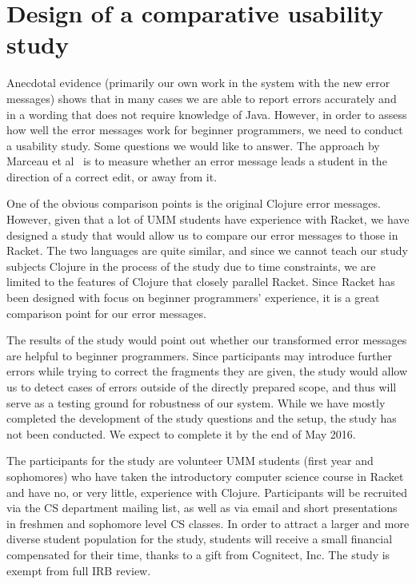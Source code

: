 \documentclass[submission,copyright,creativecommons]{eptcs}
\newcommand{\allcomments}[1]{{#1}}
\newcommand{\emcomment}[1]{{\bf \textcolor{ForestGreen}{\allcomments{{#1}}}}}
\begin{document}

\section{Design of a comparative usability study}\label{sec:study}
Anecdotal evidence (primarily our own work in the system with the new error messages) shows that 
in many cases we are able to report errors accurately and in a wording that does not require 
knowledge of Java. However, in order to assess how well the error messages work for beginner 
programmers, we need to conduct a usability study. Some questions we would like to answer. 
The approach by Marceau et al~\cite{Marceau:2011} is to measure whether an error message 
leads a student in the direction of a correct edit, or away from it. 

One of the obvious comparison points is the original Clojure error messages. However, given that 
a lot of UMM students have experience with Racket, we have designed a study that would allow us 
to compare our error messages to those in Racket. 
The two languages are quite similar, and since we
cannot teach our study subjects Clojure in the process of the study due to time constraints, we are 
limited to the features of Clojure that closely parallel Racket. 
Since Racket has been designed with focus on beginner programmers' experience,
it is a great comparison point for our error messages. 

The results of the study would point out whether our transformed error messages are helpful to beginner 
programmers. 
Since participants may introduce further errors while trying to correct the fragments they are given, 
the study would allow us to detect cases of errors outside of the directly prepared scope, and thus
will serve as a testing ground for robustness of our system.  
While we have mostly completed the development of the study questions and the setup, the
study has not been conducted. We expect to complete it by the end of May 2016. 

The participants for the study are volunteer UMM students (first year and sophomores) who have taken the introductory computer science course in Racket and have no, or very little, experience with Clojure.
Participants will be recruited via the CS department mailing list, as well as via email and short presentations in freshmen and sophomore level CS classes. 
In order to attract a larger and more diverse student population for the study, students will receive a small financial compensated for their time, thanks to a gift from Cognitect, Inc. 
The study is exempt from full IRB review. 
\end{document}

